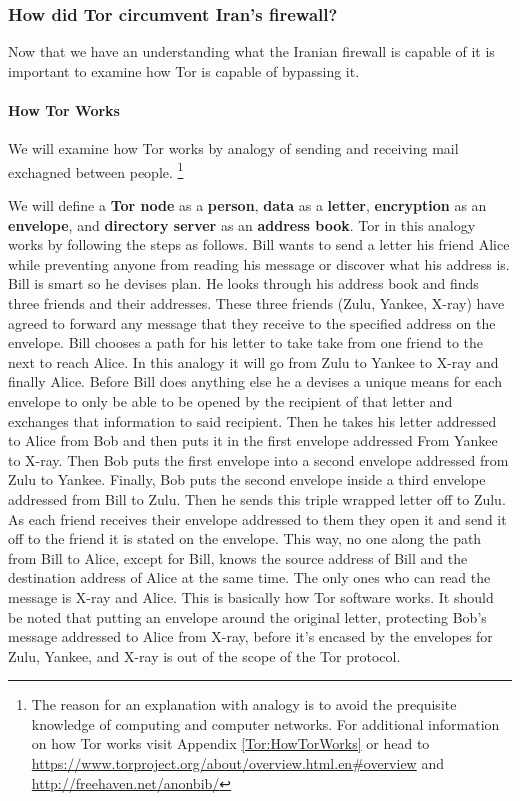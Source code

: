 \documentclass[11pt]{article}
\begin{document}
\begin{multicols}{2}
\subsubsection{How did Tor circumvent Iran's firewall?}

Now that we have an understanding what the Iranian firewall is capable of it is
important to examine how Tor is capable of bypassing it.

\paragraph{How Tor Works}
\label{HowTorWorks}
We will examine how Tor works by analogy of sending and receiving mail 
exchagned between people. 
\footnote{The reason for an explanation with analogy is to avoid the prequisite
  knowledge of computing and computer networks. For additional information on how 
  Tor works visit Appendix \ref{Tor:HowTorWorks} or head to
  \url{https://www.torproject.org/about/overview.html.en#overview} and
\url{http://freehaven.net/anonbib/}
}

We will define a \textbf{Tor node} as a \textbf{person}, \textbf{data} as a
\textbf{letter}, \textbf{encryption} as an \textbf{envelope}, and
\textbf{directory server} as an \textbf{address book}. Tor in this analogy works
by following the steps as follows. Bill wants to send a letter his friend Alice
while preventing anyone from reading his message or discover what his address is.  Bill
is smart so he devises plan. He looks through his address book and finds three
friends and their addresses.  These three friends (Zulu, Yankee, X-ray)
have agreed to forward any message that they receive to the
specified address on the envelope. Bill chooses a path for his letter to take take from one friend
to the next to reach Alice. In this analogy it will go from Zulu to Yankee to
X-ray and finally Alice. Before Bill does anything else he a devises a unique
means for each envelope to only be able to be opened by the recipient of that
letter and exchanges that information to said recipient.  Then he takes his letter addressed to Alice from Bob and then
puts it in the first envelope addressed From Yankee to X-ray.  Then Bob puts the first
envelope into a second envelope addressed from Zulu to Yankee.  Finally, Bob puts the second
envelope inside a third envelope addressed from Bill to Zulu.  Then he sends
this triple wrapped letter off to Zulu.  As each friend receives their envelope addressed to them
they open it and send it off to the friend it is stated on the envelope.  This
way, no one along the path from Bill to Alice, except for Bill, knows the source address of
Bill and the destination address of Alice at the same time.  The
only ones who can read the message is X-ray and Alice. This is basically how Tor
software works. It should be noted that putting an envelope around the original
letter, protecting Bob's message addressed to Alice from X-ray,
before it's encased by the envelopes for Zulu, Yankee, and X-ray is out of
the scope of the Tor protocol.


\end{multicols}
\end{document}
